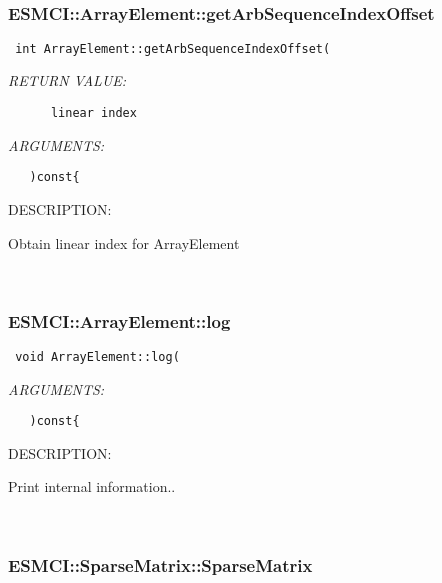  
\mbox{}\hrulefill\
 
\subsubsection [ESMCI::ArrayElement::getArbSequenceIndexOffset] {ESMCI::ArrayElement::getArbSequenceIndexOffset}


  
\begin{verbatim} int ArrayElement::getArbSequenceIndexOffset(\end{verbatim}{\em RETURN VALUE:}
\begin{verbatim}      linear index\end{verbatim}{\em ARGUMENTS:}
\begin{verbatim}   )const{\end{verbatim}
{\sf DESCRIPTION:\\ }


      Obtain linear index for ArrayElement
   
 
\mbox{}\hrulefill\
 
\subsubsection [ESMCI::ArrayElement::log] {ESMCI::ArrayElement::log}


  
\begin{verbatim} void ArrayElement::log(\end{verbatim}{\em ARGUMENTS:}
\begin{verbatim}   )const{\end{verbatim}
{\sf DESCRIPTION:\\ }


      Print internal information..
   
 
\mbox{}\hrulefill\
 
\subsubsection [ESMCI::SparseMatrix::SparseMatrix] {ESMCI::SparseMatrix::SparseMatrix}


